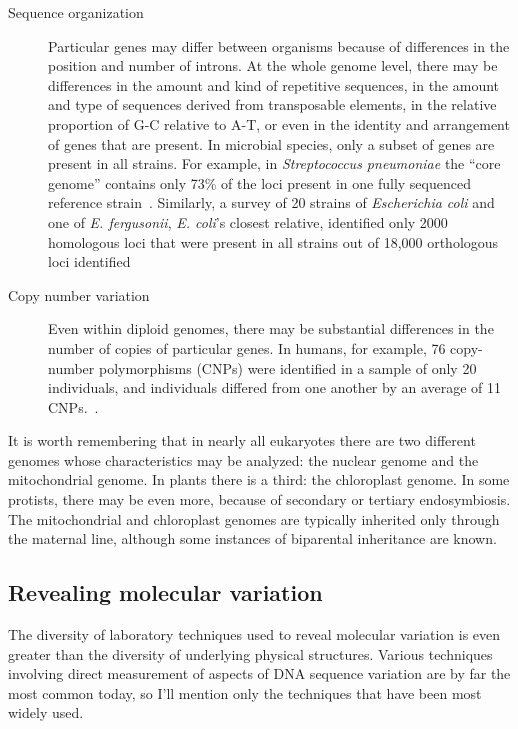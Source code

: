\documentclass[12pt]{article}
\begin{document}
\begin{description}
\item[Sequence organization] Particular genes may differ between
  organisms because of differences in the position and number of
  introns. At the whole genome level, there may be differences in the
  amount and kind of repetitive sequences, in the amount and type of
  sequences derived from transposable elements, in the relative
  proportion of G-C relative to A-T, or even in the identity and
  arrangement of genes that are present. In microbial species, only a
  subset of genes are present in all strains. For example, in {\it
    Streptococcus pneumoniae\/} the ``core genome'' contains only 73\%
  of the loci present in one fully sequenced reference
  strain~\cite{Obert-etal-2006}. Similarly, a survey of 20 strains of
  {\it Escherichia coli\/} and one of {\it E. fergusonii\/}, {\it
    E. coli\/}'s closest relative, identified only 2000 homologous
  loci that were present in all strains out of 18,000 orthologous loci
  identified~\cite{Touchon-etal-2009} 

\item[Copy number variation] Even within diploid genomes, there may be
  substantial differences in the number of copies of particular
  genes. In humans, for example, 76 copy-number polymorphisms (CNPs)
  were identified in a sample of only 20 individuals, and individuals
  differed from one another by an average of 11
  CNPs.~\cite{Sebat-etal-2004}.

\end{description}

\noindent It is worth remembering that in nearly all eukaryotes there
are two different genomes whose characteristics may be analyzed: the
nuclear genome and the mitochondrial genome. In plants there is a
third: the chloroplast genome. In some protists, there may be even
more, because of secondary or tertiary endosymbiosis. The
mitochondrial and chloroplast genomes are typically inherited only
through the maternal line, although some instances of biparental
inheritance are known.

\subsection*{Revealing molecular variation}

The diversity of laboratory techniques used to reveal molecular
variation is even greater than the diversity of underlying physical
structures. Various techniques involving direct measurement of aspects
of DNA sequence variation are by far the most common today, so I'll
mention only the techniques that have been most widely
used.
\end{document}
